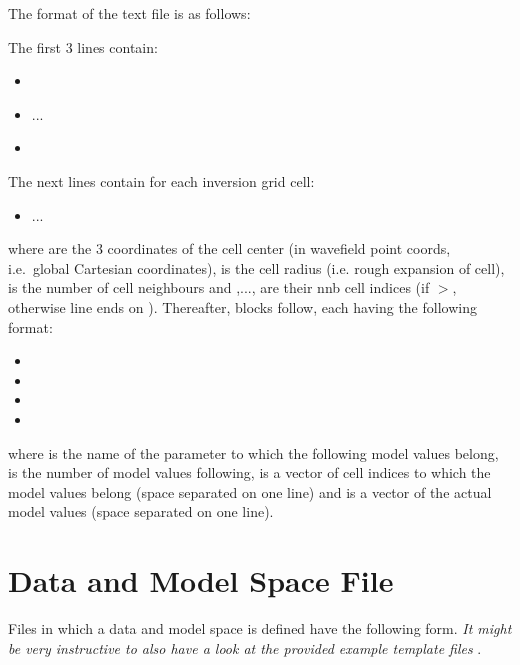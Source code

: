 The format of the text file is as follows:

The first 3 lines contain:
\begin{itemize}
\item[]
\item[]   ... 
\item[]
\end{itemize}
The next  lines contain for each inversion grid cell:
\begin{itemize}
\item[] ... 
\end{itemize} 
where  are the 3 coordinates of the cell center (in wavefield point coords, i.e.\ global 
Cartesian coordinates),  
is the cell radius (i.e. rough expansion of cell),  is the number of cell neighbours and 
,..., are their nnb cell indices (if \(>\), otherwise line 
ends on ). Thereafter,  blocks follow, each having 
the following format:
\begin{itemize}
\item[]
\item[]
\item[]
\item[]
\end{itemize}
where  is the name of the parameter to which the following model values belong, 
 is the number of model values following,  is a vector of  
cell indices to which the model values belong (space separated on one line) and  
is a vector of the actual  model values (space separated on one line).
%
\section{Data and Model Space File} \label{files,sec:dmspace}
%
Files in which a data and model space is defined have the following form. \emph{It might be very instructive 
to also have a look at the provided example template files}  .

